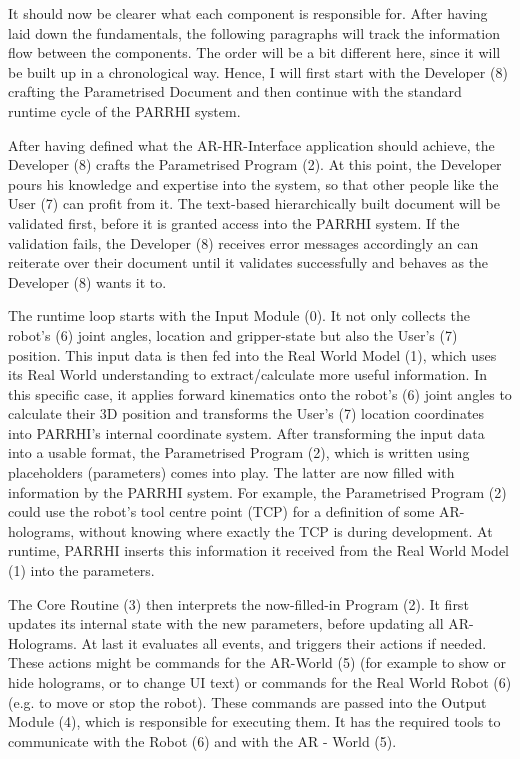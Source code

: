 It should now be clearer what each component is responsible for. After having laid down the fundamentals, the following paragraphs will track the information flow between the components. The order will be a bit different here, since it will be built up in a chronological way. Hence, I will first start with the Developer (8) crafting the Parametrised Document and then continue with the standard runtime cycle of the PARRHI system.

After having defined what the AR-HR-Interface application should achieve, the Developer (8) crafts the Parametrised Program (2). At this point, the Developer pours his knowledge and expertise into the system, so that other people like the User (7) can profit from it. The text-based hierarchically built document will be validated first, before it is granted access into the PARRHI system. If the validation fails, the Developer (8) receives error messages accordingly an can reiterate over their document until it validates successfully and behaves as the Developer (8) wants it to.

The runtime loop starts with the Input Module (0). It not only collects the robot's (6) joint angles, location and gripper-state but also the User's (7) position. This input data is then fed into the Real World Model (1), which uses its Real World understanding to extract/calculate more useful information. In this specific case, it applies forward kinematics onto the robot's (6) joint angles to calculate their 3D position and transforms the User's (7) location coordinates into PARRHI's internal coordinate system. After transforming the input data into a usable format, the Parametrised Program (2), which is written using placeholders (parameters) comes into play. The latter are now filled with information by the PARRHI system. For example, the Parametrised Program (2) could use the robot's tool centre point (TCP) for a definition of some AR-holograms, without knowing where exactly the TCP is during development. At runtime, PARRHI inserts this information it received from the Real World Model (1) into the parameters. 

The Core Routine (3) then interprets the now-filled-in Program (2). It first updates its internal state with the new parameters, before updating all AR-Holograms. At last it evaluates all events, and triggers their actions if needed. These actions might be commands for the AR-World (5) (for example to show or hide holograms, or to change UI text) or commands for the Real World Robot (6) (e.g. to move or stop the robot). These commands are passed into the Output Module (4), which is responsible for executing them. It has the required tools to communicate with the Robot (6) and with the AR - World (5). 

